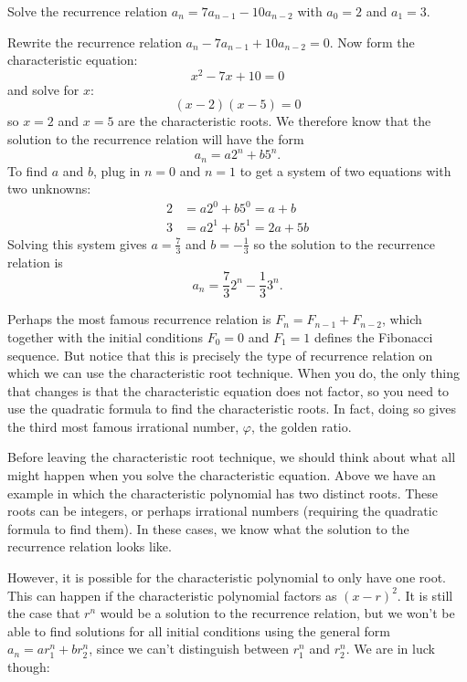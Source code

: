 \documentclass[12pt]{article}
\begin{document}
\begin{example}
  Solve the recurrence relation $a_n = 7a_{n-1} - 10 a_{n-2}$ with $a_0 = 2$ and $a_1 = 3$. 
  \begin{solution}
   Rewrite the recurrence relation $a_n - 7a_{n-1} + 10a_{n-2} = 0$.  Now form the characteristic equation:
   \[x^2 - 7x + 10 = 0\]
   and solve for $x$: 
   \[(x - 2) (x - 5) = 0\]
   so $x = 2$ and $x = 5$ are the characteristic roots.  We therefore know that the solution to the recurrence relation will have the form
   \[a_n = a 2^n + b 5^n.\]  
   To find $a$ and $b$, plug in $n =0$ and $n = 1$ to get a system of two equations with two unknowns:
   \begin{align*}
    2 & = a 2^0 + b 5^0 = a + b\\
    3 & = a 2^1 + b 5^1 = 2a + 5b
   \end{align*}
  Solving this system gives $a = \frac{7}{3}$ and $b = -\frac{1}{3}$ so the solution to the recurrence relation is
  \[a_n = \frac{7}{3}2^n - \frac{1}{3} 3^n.\]
  \end{solution}

\end{example}

Perhaps the most famous recurrence relation is $F_n = F_{n-1} + F_{n-2}$, which together with the initial conditions $F_0 = 0$ and $F_1= 1$ defines the Fibonacci sequence.  But notice that this is precisely the type of recurrence relation on which we can use the characteristic root technique.  When you do, the only thing that changes is that the characteristic equation does not factor, so you need to use the quadratic formula to find the characteristic roots.  In fact, doing so gives the third most famous irrational number, $\varphi$, the golden ratio.

Before leaving the characteristic root technique, we should think about what all might happen when you solve the characteristic equation.  Above we have an example in which the characteristic polynomial has two distinct roots.  These roots can be integers, or perhaps irrational numbers (requiring the quadratic formula to find them).  In these cases, we know what the solution to the recurrence relation looks like.  

However, it is possible for the characteristic polynomial to only have one root.  This can happen if the characteristic polynomial factors as $(x - r)^2$.  It is still the case that $r^n$ would be a solution to the recurrence relation, but we won't be able to find solutions for all initial conditions using the general form $a_n = ar_1^n + br_2^n$, since we can't distinguish between $r_1^n$ and $r_2^n$.  We are in luck though:
\end{document}
